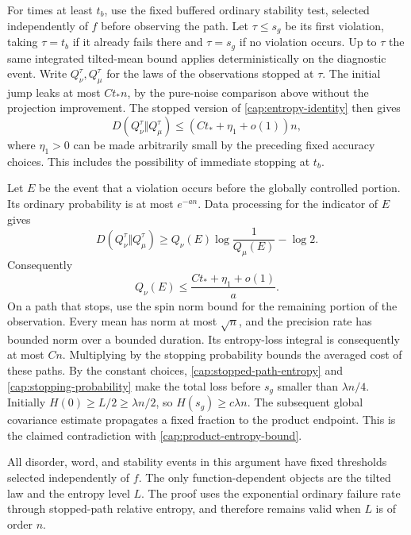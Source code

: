 For times at least $t_b$, use the fixed buffered ordinary stability test,
selected independently of $f$ before observing the path. Let $\tau\le s_g$
be its first violation, taking $\tau=t_b$ if it already fails there
and $\tau=s_g$ if no violation occurs. Up to $\tau$ the same integrated
tilted-mean bound applies deterministically on the diagnostic event. Write
$Q_\nu^\tau,Q_\mu^\tau$ for the laws of the observations stopped at $\tau$.
The initial jump leaks at most $Ct_*n$, by the pure-noise comparison above
without the projection improvement. The stopped version of
\eqref{cap:entropy-identity} then gives
\begin{equation}\label{cap:stopped-path-entropy}
 D(Q_\nu^\tau\Vert Q_\mu^\tau)
 \le (Ct_*+\eta_1+o(1))n,
\end{equation}
where $\eta_1>0$ can be made arbitrarily small by the preceding fixed
accuracy choices.  This includes the possibility of immediate stopping
at $t_b$.

Let $E$ be the event that a violation occurs before the globally
controlled portion.  Its ordinary probability is at most $e^{-an}$.
Data processing for the indicator of $E$ gives
\[
 D(Q_\nu^\tau\Vert Q_\mu^\tau)
 \ge Q_\nu(E)\log\frac1{Q_\mu(E)}-\log2.
\]
Consequently
\begin{equation}\label{cap:stopping-probability}
 Q_\nu(E)\le\frac{Ct_*+\eta_1+o(1)}a.
\end{equation}
On a path that stops, use the spin norm bound for the remaining portion of the
observation. Every mean has norm at most $\sqrt n$, and the precision rate has
bounded norm over a bounded duration. Its entropy-loss integral is
consequently at most $Cn$. Multiplying by the stopping probability bounds the
averaged cost of these paths. By the constant choices,
\eqref{cap:stopped-path-entropy} and \eqref{cap:stopping-probability} make the
total loss before $s_g$ smaller than $\lambda n/4$. Initially $H(0)\ge
L/2\ge\lambda n/2$, so $H(s_g)\ge c\lambda n$. The subsequent global
covariance estimate propagates a fixed fraction to the product endpoint. This
is the claimed contradiction with \eqref{cap:product-entropy-bound}.

All disorder, word, and stability events in this argument have fixed
thresholds selected independently of $f$. The only function-dependent objects
are the tilted law and the entropy level $L$. The proof uses the exponential
ordinary failure rate through stopped-path relative entropy, and therefore
remains valid when $L$ is of order $n$.

